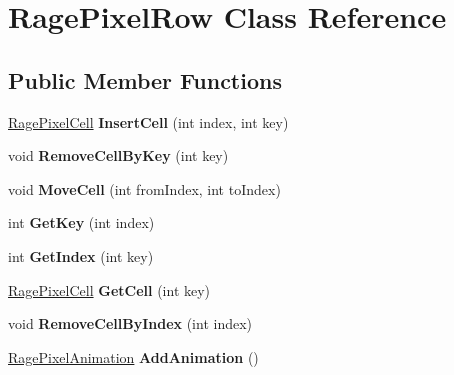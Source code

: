\hypertarget{class_rage_pixel_row}{\section{Rage\-Pixel\-Row Class Reference}
\label{class_rage_pixel_row}
}
\subsection*{Public Member Functions}
\begin{DoxyCompactItemize}
\item 
\hypertarget{class_rage_pixel_row_a55c6212ba03fa5e74972dcaaa5420446}{\hyperlink{class_rage_pixel_cell}{Rage\-Pixel\-Cell} {\bfseries Insert\-Cell} (int index, int key)}\label{class_rage_pixel_row_a55c6212ba03fa5e74972dcaaa5420446}

\item 
\hypertarget{class_rage_pixel_row_a97d722dff035e418ce9e2e0367345092}{void {\bfseries Remove\-Cell\-By\-Key} (int key)}\label{class_rage_pixel_row_a97d722dff035e418ce9e2e0367345092}

\item 
\hypertarget{class_rage_pixel_row_ac657f5709a643c2513e93200c2848306}{void {\bfseries Move\-Cell} (int from\-Index, int to\-Index)}\label{class_rage_pixel_row_ac657f5709a643c2513e93200c2848306}

\item 
\hypertarget{class_rage_pixel_row_a9581ab8cc23d2cf77651c3d860453eb9}{int {\bfseries Get\-Key} (int index)}\label{class_rage_pixel_row_a9581ab8cc23d2cf77651c3d860453eb9}

\item 
\hypertarget{class_rage_pixel_row_ada93899633516889ba64ec0252ad402d}{int {\bfseries Get\-Index} (int key)}\label{class_rage_pixel_row_ada93899633516889ba64ec0252ad402d}

\item 
\hypertarget{class_rage_pixel_row_a38dc373fe6690bb93c7f62802f6f4db4}{\hyperlink{class_rage_pixel_cell}{Rage\-Pixel\-Cell} {\bfseries Get\-Cell} (int key)}\label{class_rage_pixel_row_a38dc373fe6690bb93c7f62802f6f4db4}

\item 
\hypertarget{class_rage_pixel_row_a203534742a7eaa432df80c664f1f9960}{void {\bfseries Remove\-Cell\-By\-Index} (int index)}\label{class_rage_pixel_row_a203534742a7eaa432df80c664f1f9960}

\item 
\hypertarget{class_rage_pixel_row_a45a5388593c9067c07647d157a9e1fb2}{\hyperlink{class_rage_pixel_animation}{Rage\-Pixel\-Animation} {\bfseries Add\-Animation} ()}\label{class_rage_pixel_row_a45a5388593c9067c07647d157a9e1fb2}


\end{DoxyCompactItemize}
